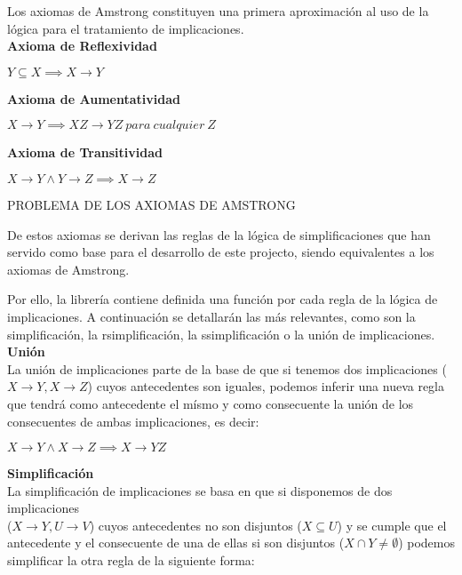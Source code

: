 Los axiomas de Amstrong constituyen una primera aproximaci\'on al uso de la l\'ogica para el tratamiento de implicaciones.\\

\textbf{Axioma de Reflexividad}

\begin{center}
    \(Y \subseteq X \implies X \to Y \)
\end{center}

\textbf{Axioma de Aumentatividad}

\begin{center}
    \(X \to Y \implies XZ \to YZ \ para \ cualquier \ Z \)
\end{center}

\textbf{Axioma de Transitividad}

\begin{center}
    \(X \to Y \wedge Y \to Z \implies X \to Z \)
\end{center}

PROBLEMA DE LOS AXIOMAS DE AMSTRONG

De estos axiomas se derivan las reglas de la l\'ogica de simplificaciones que han servido como base para el desarrollo de este projecto, siendo equivalentes a los axiomas de Amstrong.

Por ello, la librer\'ia contiene definida una funci\'on por cada regla de la l\'ogica de implicaciones. A continuaci\'on se detallar\'an las m\'as relevantes, como son la simplificaci\'on, la rsimplificaci\'on, la ssimplificaci\'on o la uni\'on de implicaciones.\\

\textbf{Uni\'on}\\
La uni\'on de implicaciones parte de la base de que si tenemos dos implicaciones (\(X \to Y , X \to Z\)) cuyos antecedentes son iguales, podemos inferir una nueva regla que tendr\'a como antecedente el m\'ismo y como consecuente la uni\'on de los consecuentes de ambas implicaciones, es decir:

\begin{center}
    \(X \to Y \wedge X \to Z \implies X \to YZ \)
\end{center}


\bigskip
\textbf{Simplificaci\'on}\\
La simplificaci\'on de implicaciones se basa en que si disponemos de dos implicaciones \\ (\(X \to Y , U \to V\)) cuyos antecedentes no son disjuntos (\(X \subseteq U\)) y se cumple que el antecedente y el consecuente de una de ellas si son disjuntos (\(X \cap Y \neq \emptyset\)) podemos simplificar la otra regla de la siguiente forma:


